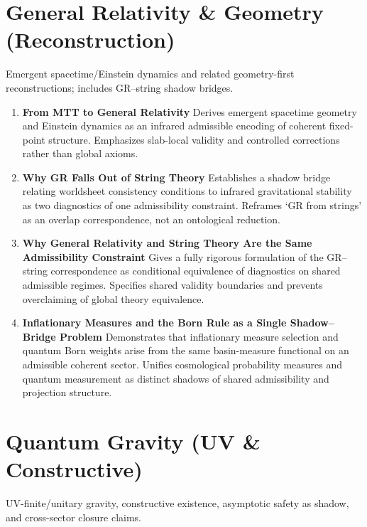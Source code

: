 \documentclass[11pt]{article}
\begin{document}
\section{General Relativity \& Geometry (Reconstruction)}
Emergent spacetime/Einstein dynamics and related geometry-first reconstructions; includes GR–string shadow bridges.

\begin{enumerate}[leftmargin=*]
\item \textbf{From MTT to General Relativity} Derives emergent spacetime geometry and Einstein dynamics as an infrared admissible encoding of coherent fixed-point structure. Emphasizes slab-local validity and controlled corrections rather than global axioms.
\item \textbf{Why GR Falls Out of String Theory} Establishes a shadow bridge relating worldsheet consistency conditions to infrared gravitational stability as two diagnostics of one admissibility constraint. Reframes ‘GR from strings’ as an overlap correspondence, not an ontological reduction.
\item \textbf{Why General Relativity and String Theory Are the Same Admissibility Constraint} Gives a fully rigorous formulation of the GR–string correspondence as conditional equivalence of diagnostics on shared admissible regimes. Specifies shared validity boundaries and prevents overclaiming of global theory equivalence.


\item \textbf{Inflationary Measures and the Born Rule as a Single Shadow--Bridge Problem}
Demonstrates that inflationary measure selection and quantum Born weights arise from the same basin-measure functional on an admissible coherent sector. Unifies cosmological probability measures and quantum measurement as distinct shadows of shared admissibility and projection structure.

\end{enumerate}

\section{Quantum Gravity (UV \& Constructive)}
UV-finite/unitary gravity, constructive existence, asymptotic safety as shadow, and cross-sector closure claims.
\end{document}
